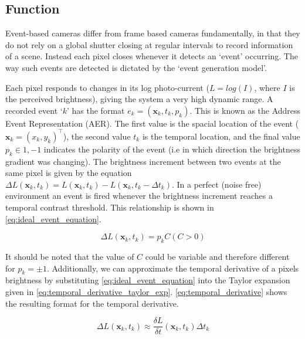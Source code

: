 \subsection{Function} \label{ssec:event_camera_function}
Event-based cameras differ from frame based cameras fundamentally, in that they do not rely on a global shutter closing at regular intervals to record information of a scene. Instead each pixel closes whenever it detects an `event' occurring. The way such events are detected is dictated by the `event generation model'\cite{EventBasedVisionASurvery}.

Each pixel responds to changes in its log photo-current ($ L = log(I) $, where $I$ is the perceived brightness), giving the system a very high dynamic range. A recorded event `$ k $' has the format $ e_k = (\boldsymbol{\mathbf{x}}_k, t_k, p_k ) $. This is known as the Address Event Representation (AER). The first value is the spacial location of the event ($ \boldsymbol{\mathbf{x}}_k = (x_k, y_k)^\top $), the second value $ t_k $ is the temporal location, and the final value $ p_k \in {1, -1} $ indicates the polarity of the event (i.e in which direction the brightness gradient was changing). The brightness increment between two events at the same pixel is given by the equation $ \Delta L(\boldsymbol{\mathbf{x}}_k, t_k) = L(\boldsymbol{\mathbf{x}}_k, t_k) - L(\boldsymbol{\mathbf{x}}_k, t_k - \Delta t_k) $. In a perfect (noise free) environment an event is fired whenever the brightness increment reaches a temporal contrast threshold. This relationship is shown in \cref{eq:ideal_event_equation}.

\begin{equation}
      \Delta L(\boldsymbol{\mathbf{x}}_k, t_k) = p_k C ( C > 0 )
      \label{eq:ideal_event_equation}
\end{equation}

It should be noted that the value of $ C $ could be variable and therefore different for $ p_k = \pm 1 $. Additionally, we can approximate the temporal derivative of a pixels brightness by substituting \cref{eq:ideal_event_equation} into the Taylor expansion given in \cref{eq:temporal_derivative_taylor_exp}. \cref{eq:temporal_derivative} shows the resulting format for the temporal derivative.

\begin{equation}
      \Delta L(\boldsymbol{\mathbf{x}}_k, t_k) \approx \frac{\delta L}{\delta t}(\boldsymbol{\mathbf{x}}_k, t_k)\Delta t_k
      \label{eq:temporal_derivative_taylor_exp}
\end{equation}

